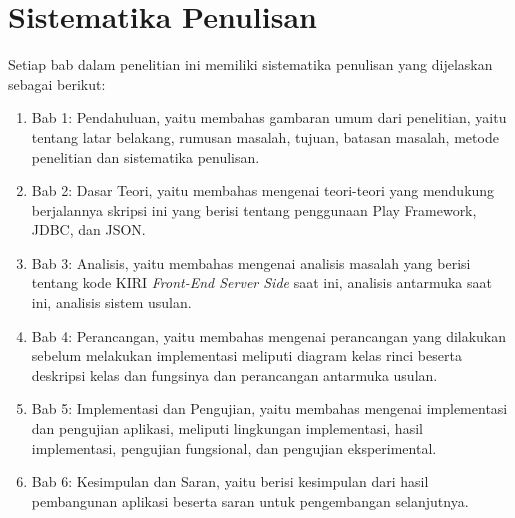 \section{Sistematika Penulisan}
\label{sec:sistematikaPenulisan}
Setiap bab dalam penelitian ini memiliki sistematika penulisan yang dijelaskan sebagai berikut:
	\begin{enumerate}
		\item Bab 1: Pendahuluan, yaitu membahas gambaran umum dari penelitian, yaitu tentang latar belakang, rumusan masalah, tujuan, batasan masalah, metode penelitian dan sistematika penulisan.
		\item Bab 2: Dasar Teori, yaitu membahas mengenai teori-teori yang mendukung berjalannya skripsi ini yang berisi tentang penggunaan Play Framework, JDBC, dan JSON.
		\item Bab 3: Analisis, yaitu membahas mengenai analisis masalah yang berisi tentang kode KIRI \textit{Front-End Server Side} saat ini, analisis antarmuka saat ini, analisis sistem usulan.
	\item Bab 4: Perancangan, yaitu membahas mengenai perancangan yang dilakukan sebelum melakukan implementasi meliputi diagram kelas rinci beserta deskripsi kelas dan fungsinya dan perancangan antarmuka usulan.
	\item Bab 5: Implementasi dan Pengujian, yaitu membahas mengenai implementasi dan pengujian aplikasi, meliputi lingkungan implementasi, hasil implementasi, pengujian fungsional, dan pengujian eksperimental.
	\item Bab 6: Kesimpulan dan Saran, yaitu berisi kesimpulan dari hasil pembangunan aplikasi beserta saran untuk pengembangan selanjutnya.
	\end{enumerate}
		